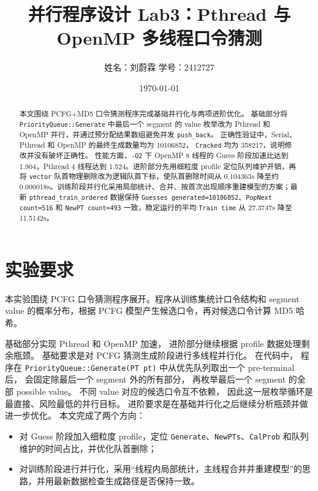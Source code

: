 \documentclass[UTF8,a4paper,12pt]{ctexart}
\title{并行程序设计 Lab3：Pthread 与 OpenMP 多线程口令猜测}
\author{姓名：刘蔚霖 \quad 学号：2412727}
\date{\today}
\begin{document}
\maketitle

\begin{abstract}
本文围绕 PCFG+MD5 
口令猜测程序完成基础并行化与两项进阶优化。
基础部分将 \texttt{PriorityQueue::Generate} 
中最后一个 segment 的 value 枚举改为 Pthread 和 
OpenMP 并行，并通过预分配结果数组避免并发 
\texttt{push\_back}。
正确性验证中，Serial、Pthread 和 OpenMP 
的最终生成数量均为 10106852，
\texttt{Cracked} 均为 358217，说明修改并没有破坏正确性。
性能方面，\texttt{-O2} 下 OpenMP 8 线程的 Guess 阶段加速比达到 1.904，Pthread 4 线程达到 1.524。进阶部分先用细粒度 profile 定位队列维护开销，再将 \texttt{vector} 队首物理删除改为逻辑队首下标，使队首删除时间从 0.104363s 降至约 0.000018s。训练阶段并行化采用局部统计、合并、按首次出现顺序重建模型的方案；最新 \texttt{pthread\_train\_ordered} 数据保持 \texttt{Guesses generated=10106852}、\texttt{PopNext count=516} 和 \texttt{NewPT count=493} 一致，稳定运行的平均 \texttt{Train time} 从 27.3747s 降至 11.5142s。
\end{abstract}

\tableofcontents
\newpage

\section{实验要求}

本实验围绕 PCFG 口令猜测程序展开。程序从训练集统计口令结构和 segment value 的概率分布，根据 PCFG 模型产生候选口令，再对候选口令计算 MD5 哈希。

基础部分实现 Pthread 和 OpenMP 加速，
进阶部分继续根据 profile 数据处理剩余瓶颈。
基础要求是对 PCFG 猜测生成阶段进行多线程并行化。
在代码中，
程序在 \texttt{PriorityQueue::Generate(PT pt)}
 中从优先队列取出一个 pre-terminal 后，
 会固定除最后一个 segment 外的所有部分，
 再枚举最后一个 segment 的全部 possible value。
 不同 value 对应的候选口令互不依赖，
 因此这一层枚举循环是最直接、风险最低的并行目标。
进阶要求是在基础并行化之后继续分析瓶颈并做进一步优化。
本文完成了两个方向：

\begin{itemize}
  \item 对 Guess 阶段加入细粒度 profile，定位 \texttt{Generate}、\texttt{NewPTs}、\texttt{CalProb} 和队列维护的时间占比，并优化队首删除；
  \item 对训练阶段进行并行化，采用“线程内局部统计，主线程合并并重建模型”的思路，并用最新数据检查生成路径是否保持一致。
\end{itemize}
\end{document}

